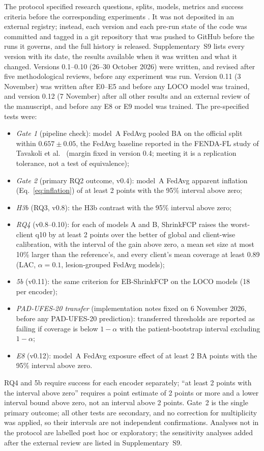 \documentclass[VANCOUVER,Times1COL]{WileyNJDv5}
\begin{document}
The protocol specified research questions, splits, models, metrics and success criteria before the
corresponding experiments \cite{nosek2018preregistration}. It was not deposited in an external registry;
instead, each version and each pre-run state of the code was committed and tagged in a git repository that
was pushed to GitHub before the runs it governs, and the full history is released. Supplementary~S9 lists every
version with its date, the results available when it was written and what it changed. Versions 0.1--0.10
(26--30 October 2026) were written, and revised after five methodological reviews, before any experiment
was run. Version 0.11 (3 November) was written after E0--E5 and before any LOCO model was trained, and
version 0.12 (7 November) after all other results and an external review of the manuscript, and before
any E8 or E9 model was trained. The pre-specified tests were:
\begin{itemize}
  \item \emph{Gate 1} (pipeline check): model~A FedAvg pooled BA on the official split within
    $0.657\pm0.05$, the FedAvg baseline reported in the FENDA-FL study of Tavakoli et al.\
    \cite{tavakoli2024fendafl} (margin fixed in version 0.4; meeting it is a replication tolerance, not
    a test of equivalence);
  \item \emph{Gate 2} (primary RQ2 outcome, v0.4): model~A FedAvg apparent inflation
    (Eq.~\ref{eq:inflation}) of at least 2 points with the 95\% interval above zero;
  \item \emph{H3b} (RQ3, v0.8): the H3b contrast with the 95\% interval above zero;
  \item \emph{RQ4} (v0.8--0.10): for each of models A and B, ShrinkFCP raises the worst-client q10 by at
    least 2 points over the better of global and client-wise calibration, with the interval of the gain
    above zero, a mean set size at most 10\% larger than the reference's, and every client's mean coverage
    at least 0.89 (LAC, $\alpha=0.1$, lesion-grouped FedAvg models);
  \item \emph{5b} (v0.11): the same criterion for EB-ShrinkFCP on the LOCO models (18 per encoder);
  \item \emph{PAD-UFES-20 transfer} (implementation notes fixed on 6 November 2026, before any
    PAD-UFES-20 prediction): transferred thresholds are reported as failing if coverage is below
    $1-\alpha$ with the patient-bootstrap interval excluding $1-\alpha$;
  \item \emph{E8} (v0.12): model~A FedAvg exposure effect of at least 2 BA points with the 95\% interval
    above zero.
\end{itemize}
RQ4 and 5b require success for each encoder separately; ``at least 2 points with the interval above
zero'' requires a point estimate of 2 points or more and a lower interval bound above zero, not an
interval above 2 points. Gate~2 is the single primary outcome; all other tests are secondary, and no
correction for multiplicity was applied, so their intervals are not independent confirmations.
Analyses not in the protocol are labelled post hoc or exploratory; the sensitivity analyses added after
the external review are listed in Supplementary~S9.
\end{document}
